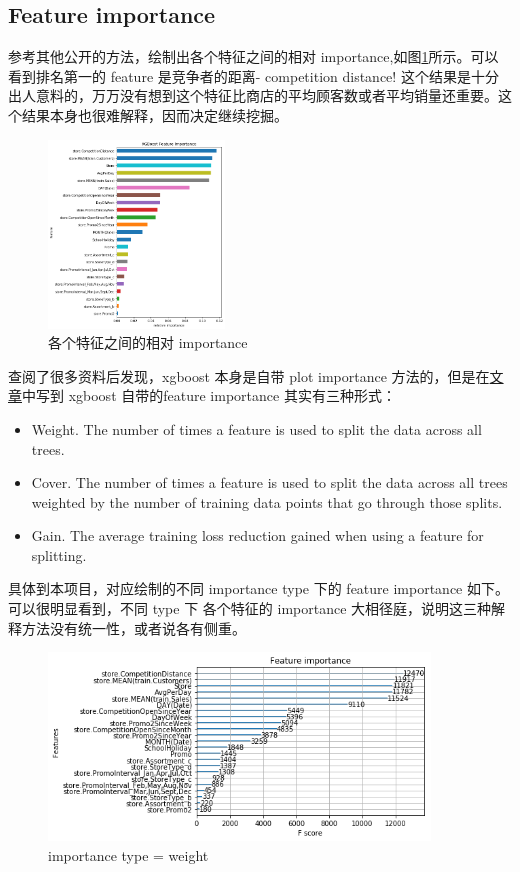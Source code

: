 \documentclass[a4paper]{article}
\begin{document}
\subsection{Feature importance}
参考其他公开的方法，绘制出各个特征之间的相对 importance,如图\ref{fig:importance ratio}所示。可以看到排名第一的 feature 是竞争者的距离- competition distance! 这个结果是十分出人意料的，万万没有想到这个特征比商店的平均顾客数或者平均销量还重要。这个结果本身也很难解释，因而决定继续挖掘。

\begin{figure}[ht]
 \centering
 \includegraphics[height=5cm,width=\textwidth]{images/importance}
 \caption{各个特征之间的相对 importance}
 \label{fig:importance ratio}
\end{figure}

查阅了很多资料后发现，xgboost 本身是自带 plot importance 方法的，但是在\href{https://towardsdatascience.com/interpretable-machine-learning-with-xgboost-9ec80d148d27}{文章}中写到 xgboost 自带的feature importance 其实有三种形式：
\begin{itemize}
    \item Weight. The number of times a feature is used to split the data across all trees.
    \item Cover. The number of times a feature is used to split the data across all trees weighted by the number of training data points that go through those splits.
    \item Gain. The average training loss reduction gained when using a feature for splitting.
\end{itemize}
具体到本项目，对应绘制的不同 importance type 下的 feature importance 如下。可以很明显看到，不同 type 下 各个特征的 importance 大相径庭，说明这三种解释方法没有统一性，或者说各有侧重。
\begin{figure}[ht]
 \centering
 \includegraphics[height=5cm,width=\textwidth]{images/weight}
 \caption{importance type = weight}
 \label{fig:weight}
\end{figure}
\end{document}

